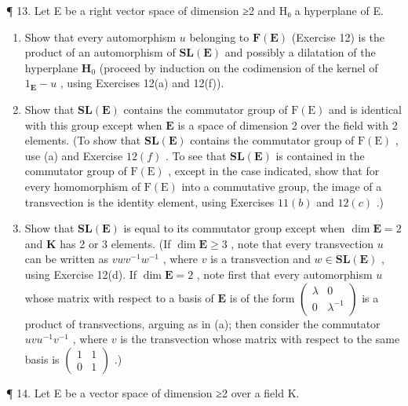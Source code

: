 ¶ 13. Let E be a right vector space of dimension ≥2 and H₀ a hyperplane of E.

\begin{enumerate}
\def\labelenumi{(\alph{enumi})}
\item
  Show that every automorphism \(u\) belonging to \(\mathbf{F}(\mathbf{E})\) (Exercise 12) is the product of an automorphism of \(\mathbf{SL}(\mathbf{E})\) and possibly a dilatation of the hyperplane \(\mathbf{H}_0\) (proceed by induction on the codimension of the kernel of \(1_{\mathbf{E}} - u\) , using Exercises 12(a) and 12(f)).
\item
  Show that \(\mathbf{SL}(\mathbf{E})\) contains the commutator group of \(\mathrm{F(E)}\) and is identical with this group except when \(\mathbf{E}\) is a space of dimension 2 over the field with 2 elements. (To show that \(\mathbf{SL}(\mathbf{E})\) contains the commutator group of \(\mathrm{F(E)}\) , use (a) and Exercise \(12(f)\) . To see that \(\mathbf{SL}(\mathbf{E})\) is contained in the commutator group of \(\mathrm{F(E)}\) , except in the case indicated, show that for every homomorphism of \(\mathrm{F(E)}\) into a commutative group, the image of a transvection is the identity element, using Exercises \(11(b)\) and \(12(c)\) .)
\item
  Show that \(\mathbf{SL}(\mathbf{E})\) is equal to its commutator group except when \(\dim \mathbf{E} = 2\) and \(\mathbf{K}\) has 2 or 3 elements. (If \(\dim \mathbf{E} \geqslant 3\) , note that every transvection \(u\) can be written as \(vwv^{-1}w^{-1}\) , where \(v\) is a transvection and \(w \in \mathbf{SL}(\mathbf{E})\) , using Exercise 12(d). If \(\dim \mathbf{E} = 2\) , note first that every automorphism \(u\) whose matrix with respect to a basis of \(\mathbf{E}\) is of the form \(\begin{pmatrix} \lambda & 0 \\ 0 & \lambda^{-1} \end{pmatrix}\) is a product of transvections, arguing as in (a); then consider the commutator \(uvu^{-1}v^{-1}\) , where \(v\) is the transvection whose matrix with respect to the same basis is \(\begin{pmatrix} 1 & 1 \\ 0 & 1 \end{pmatrix}\) .)
\end{enumerate}

¶ 14. Let E be a vector space of dimension ≥2 over a field K.

